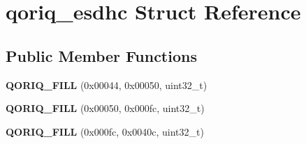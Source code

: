 \hypertarget{structqoriq__esdhc}{}\section{qoriq\+\_\+esdhc Struct Reference}
\label{structqoriq__esdhc}
\subsection*{Public Member Functions}
\begin{DoxyCompactItemize}
\item 
\mbox{\label{structqoriq__esdhc_ae44d1fa1549dd4e0b59c08192bcb92de}} 
{\bfseries Q\+O\+R\+I\+Q\+\_\+\+F\+I\+LL} (0x00044, 0x00050, uint32\+\_\+t)
\item 
\mbox{\label{structqoriq__esdhc_a0be159987eb557916203a383805f23d0}} 
{\bfseries Q\+O\+R\+I\+Q\+\_\+\+F\+I\+LL} (0x00050, 0x000fc, uint32\+\_\+t)
\item 
\mbox{\label{structqoriq__esdhc_a2bc3345078bd85c76b711c41f9497e94}} 
{\bfseries Q\+O\+R\+I\+Q\+\_\+\+F\+I\+LL} (0x000fc, 0x0040c, uint32\+\_\+t)
\end{DoxyCompactItemize}
